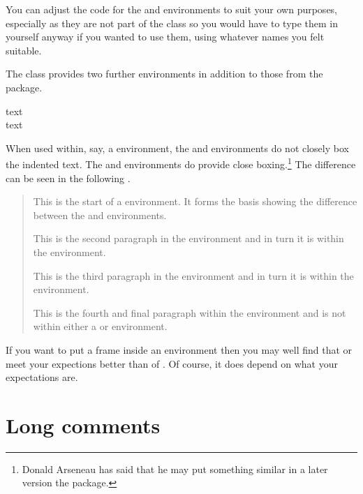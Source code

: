     You can adjust the code for the  and 
environments to suit your own purposes, especially as they are not 
part of the class so you would have to type them in yourself anyway
if you wanted to use them, using whatever names you felt suitable.


    The class provides two further environments in addition to those
from the  package.
\begin{syntax}
 text  \\
 text  \\
\end{syntax}

   When used within, say, a  environment, the 
and  environments do not closely box the indented text. The
 and  environments do provide close 
boxing.\footnote{Donald Arseneau has said that he may put something similar
in a later version the  package.}
The difference can be seen in the following .

\begin{quotation}
This is the start of a  environment. It forms the basis showing
the difference between the  and  environments.

\begin{qframe}
This is the second paragraph in the  environment and in turn it 
is within the  environment.
\end{qframe}

\begin{framed}
This is the third paragraph in the  environment and in turn it 
is within the  environment.
\end{framed}

This is the fourth and final paragraph within the  environment
and is not within either a  or  environment.
\end{quotation}

    If you want to put a frame inside an  environment
then you may well find that  or  meet your
expections better than  of . Of course, it does
depend on what your expectations are.


\section{Long comments}

